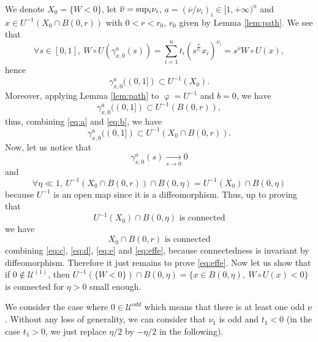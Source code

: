\documentclass[12pt]{amsart}
\numberwithin{equation}{section}
\numberwithin{figure}{section}
\DeclareMathOperator{\phii}{\varphi}
\def\uuu{{\mathcal U}}\def\vvv{{\mathcal V}}\def\www{{\mathcal W}}\def\xxx{{\mathcal X}}
\begin{document}
We denote $X_0 = \{W<0\}$, let $\overline \nu = \sup\negthinspace_i\nu_i$, $a = (\overline\nu/\nu_i)_i\in[1,+\infty)^n$ and $x\in U^{-1}(X_0\cap B(0,r))$ with $0<r<r_0$, $r_0$ given by Lemma \ref{lem:path}. We see that
\begin{equation*}
\forall s\in[0,1],\ W\circ U (\gamma^a_{x,0}(s)) = \sum_{i=1}^nt_i(s^{\frac{\overline\nu}{\nu_i}}x_i)^{\nu_i} = s^{\overline\nu}W\circ U(x),
\end{equation*}
hence
\begin{equation}\label{eq:a}\tag{a}
\gamma^a_{x,0}((0,1])\subset U^{-1}(X_0).
\end{equation}
Moreover, applying Lemma \ref{lem:path} to $\phii = U^{-1}$ and $b=0$, we have
\begin{equation}\label{eq:b}\tag{b}
\gamma^a_{x,0}((0,1])\subset U^{-1}(B(0,r)),
\end{equation}
thus, combining \eqref{eq:a} and \eqref{eq:b}, we have
\begin{equation}\label{eq:c}\tag{c}
\gamma^a_{x,0}((0,1])\subset U^{-1}(X_0\cap B(0,r)).
\end{equation}
Now, let us notice that
\begin{equation}\label{eq:d}\tag{d}
\gamma^a_{x,0}(s)\xrightarrow[s\to0]{}0
\end{equation}
and
\begin{equation}\label{eq:e}\tag{e}
\forall \eta \ll 1,\ U^{-1}(X_0\cap B(0,r))\cap B(0,\eta) = U^{-1}(X_0)\cap B(0,\eta)
\end{equation}
because $U^{-1}$ is an open map since it is a diffeomorphism. Thus, up to proving that
\begin{equation}\label{eq:effe}\tag{f}
U^{-1}(X_0)\cap B(0,\eta) \mbox{ is connected}
\end{equation}
we have
\begin{equation*}
X_0\cap B(0,r) \mbox{ is connected}
\end{equation*}
combining \eqref{eq:c}, \eqref{eq:d}, \eqref{eq:e} and \eqref{eq:effe}, because connectedness is invariant by diffeomorphism. Therefore it just remains to prove \eqref{eq:effe}. Now let us show that if $0\notin\uuu^{(1)}$, then $U^{-1}(\{W<0\})\cap B(0,\eta) = \{x\in B(0,\eta),\ W\circ U(x)<0\}$ is connected for $\eta>0$ small enough.

We consider the case where $0\in\uuu^{odd}$ which means that there is at least one odd $\nu$. Without any loss of generality, we can consider that $\nu_1$ is odd and $t_1<0$ (in the case $t_1>0$, we just replace $\eta/2$ by $-\eta/2$ in the following).
\end{document}
